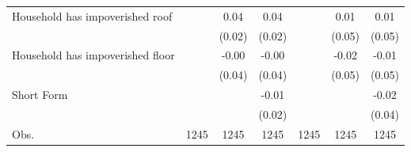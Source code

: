 {\begin{tabular}{l*{6}{c}}
Household has impoverished roof&                     &        0.04\sym{*}  &        0.04\sym{*}  &                     &        0.01         &        0.01         \\
                    &                     &      (0.02)         &      (0.02)         &                     &      (0.05)         &      (0.05)         \\
Household has impoverished floor&                     &       -0.00         &       -0.00         &                     &       -0.02         &       -0.01         \\
                    &                     &      (0.04)         &      (0.04)         &                     &      (0.05)         &      (0.05)         \\
Short Form          &                     &                     &       -0.01         &                     &                     &       -0.02         \\
                    &                     &                     &      (0.02)         &                     &                     &      (0.04)         \\
\hline
Obs.                &        1245         &        1245         &        1245         &        1245         &        1245         &        1245         \\
\hline\hline
\end{tabular}
}
